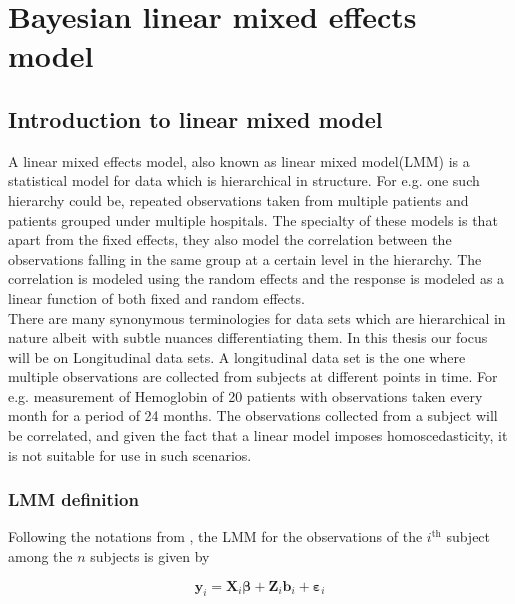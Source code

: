 
\chapter{Bayesian linear mixed effects model}
\label{ch : blmm}

\section{Introduction to linear mixed model}
\label{sec : lmm}
A linear mixed effects model, also known as linear mixed model(LMM) is a statistical model for data which is hierarchical in structure. For e.g. one such hierarchy could be, repeated observations taken from multiple patients and patients grouped under multiple hospitals. The specialty of these models is that apart from the fixed effects, they also model the correlation between the observations falling in the same group at a certain level in the hierarchy. The correlation is modeled using the random effects and the response is modeled as a linear function of both fixed and random effects.\\

There are many synonymous terminologies for data sets which are hierarchical in nature albeit with subtle nuances differentiating them. In this thesis our focus will be on Longitudinal data sets. A longitudinal data set is the one where multiple observations are collected from subjects at different points in time. For e.g. measurement of Hemoglobin of 20 patients with observations taken every month for a period of 24 months. The observations collected from a subject will be correlated, and given the fact that a linear model imposes homoscedasticity, it is not suitable for use in such scenarios.

\subsection{LMM definition}
\label{subsec : lmm_definition}
Following the notations from \citet{lesaffre_bayesian_2012}, the LMM for the observations of the $i^\text{th}$ subject among the $n$ subjects is given by

\begin{equation}
\label{eq : lmm_definition}
\boldsymbol{y}_i = \boldsymbol{X}_{i}\boldsymbol{\beta} + \boldsymbol{Z}_{i}\boldsymbol{b}_{i} + \boldsymbol{\varepsilon}_{i}
\end{equation}

